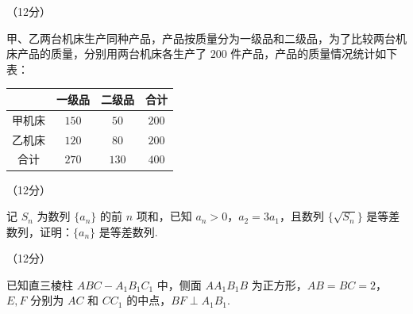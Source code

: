 \documentclass[a4paper,11pt]{report}
\begin{document}
\begin{examanswers}[start=17]

\item（12分）

甲、乙两台机床生产同种产品，产品按质量分为一级品和二级品，为了比较两台机床产品的质量，分别用两台机床各生产了 $200$ 件产品，产品的质量情况统计如下表：

\begin{tightcenter}
{\renewcommand{\arraystretch}{0.9}
\begin{tabular}{|c|c|c|c|}
\hline
& 一级品 & 二级品 & 合计 \\ \hline
甲机床 & $150$ & $50$ & $200$ \\ \hline
乙机床 & $120$ & $80$ & $200$ \\ \hline
合计 & $270$ & $130$ & $400$ \\ \hline
\end{tabular}}
\end{tightcenter}



\item（12分）

记 $S_n$ 为数列 $\{a_n\}$ 的前 $n$ 项和，已知 $a_n>0$，$a_2=3a_1$，且数列 $\{\sqrt{S_n}\}$ 是等差数列，证明：$\{a_n\}$ 是等差数列.

\item（12分）

已知直三棱柱 $ABC-A_1B_1C_1$ 中，侧面 $AA_1B_1B$ 为正方形，$AB=BC=2$，$E,F$ 分别为 $AC$ 和 $CC_1$ 的中点，$BF\perp A_1B_1$.

\noindent\begin{minipage}[t]{0.65\linewidth}


\end{minipage}
\end{examanswers}
\end{document}
